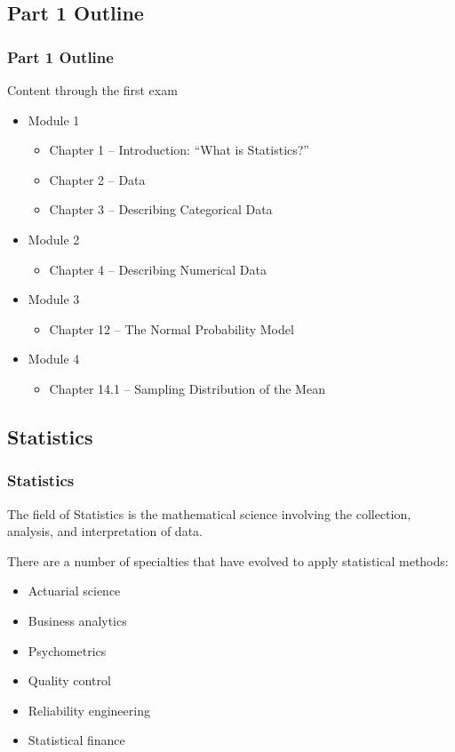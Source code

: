 \documentclass[handout]{beamer}
\begin{document}
\subsection{Part 1 Outline}
\begin{frame}
\frametitle{Part 1 Outline}

Content through the first exam

\begin{itemize}
\item Module 1
  \begin{itemize}
  \item Chapter 1 -- Introduction: ``What is Statistics?''
  \item Chapter 2 -- Data
  \item Chapter 3 -- Describing Categorical Data
  \end{itemize}
\item Module 2
  \begin{itemize}
  \item Chapter 4 -- Describing Numerical Data
  \end{itemize}
\item Module 3
  \begin{itemize}
  \item Chapter 12 --  The Normal Probability Model
  \end{itemize}
\item Module 4
  \begin{itemize}
  \item Chapter 14.1 -- Sampling Distribution of the Mean
  \end{itemize}
\end{itemize}
\end{frame}




\subsection{Statistics}
\begin{frame}
\frametitle{Statistics}

\pause

\begin{definition}
The field of \alert{Statistics} is the mathematical science involving the 
collection, analysis, and interpretation of data.
\end{definition}

\vspace{0.1in} \pause

There are a number of specialties that have evolved to apply statistical methods:
\begin{itemize}
\item Actuarial science
\item Business analytics
\item Psychometrics
\item Quality control
\item Reliability engineering
\item Statistical finance
\end{itemize}
\end{frame}
\end{document}
